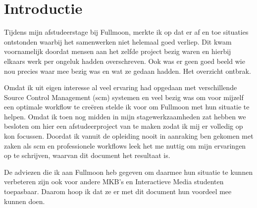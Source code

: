 \setcounter{chapter}{0}
\chapter{Introductie}
  
Tijdens mijn afstudeerstage bij Fullmoon, merkte ik op dat er af en toe situaties ontstonden waarbij het samenwerken niet helemaal goed verliep. Dit kwam voornamelijk doordat mensen aan het zelfde project bezig waren en hierbij elkaars werk per ongeluk hadden overschreven. Ook was er geen goed beeld wie nou precies waar mee bezig was en wat ze gedaan hadden. Het overzicht ontbrak.
  
Omdat ik uit eigen interesse al veel ervaring had opgedaan met verschillende Source Control Management ({\sc scm}) systemen en veel bezig was om voor mijzelf een optimale workflow te creëren stelde ik voor om Fullmoon met hun situatie te helpen. Omdat ik toen nog midden in mijn stagewerkzaamheden zat hebben we besloten om hier een afstudeerproject van te maken zodat ik mij er volledig op kon focussen. Doordat ik vanuit de opleiding nooit in aanraking ben gekomen met zaken als {\sc scm} en professionele workflows leek het me nuttig om mijn ervaringen op te schrijven, waarvan dit document het resultaat is.

De adviezen die ik aan Fullmoon heb gegeven om daarmee hun situatie te kunnen verbeteren zijn ook voor andere MKB's en Interactieve Media studenten toepasbaar. Daarom hoop ik dat ze er met dit document hun voordeel mee kunnen doen.
